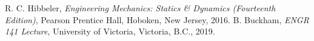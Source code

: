 \documentclass[12pt]{article}
\begin{document}
\pagebreak
{}
\begin{thebibliography}{2}
    R. C. Hibbeler, \textit{Engineering Mechanics: Statics \& Dynamics (Fourteenth Edition)}, Pearson Prentice Hall, Hoboken, New Jersey, 2016.
    B. Buckham, \textit{ENGR 141 Lecture}, University of Victoria, Victoria, B.C., 2019.
\end{thebibliography}
\end{document}
